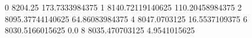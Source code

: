 0 8204.25 173.7333984375
1 8140.72119140625 110.20458984375
2 8095.37744140625 64.86083984375
4 8047.0703125 16.5537109375
6 8030.5166015625 0.0
8 8035.470703125 4.9541015625
